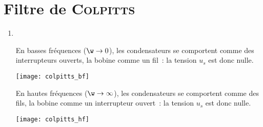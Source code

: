 \documentclass[a4paper, 12pt, final, garamond]{book}
\begin{document}
\section{Filtre de \textsc{Colpitts}}
\begin{enumerate}
    \item ~

        \vspace{-18pt}
        \begin{minipage}{0.48\linewidth}
            En basses fréquences ($\w \rightarrow 0$), les condensateurs se
            comportent comme des interrupteurs ouverts, la bobine comme un fil~: la
            tension $u_s$ est donc nulle.
            \begin{center}
                \texttt{[image: colpitts\_bf]}
            \end{center}
        \end{minipage}
        \hfill
        \vrule
        \hfill
        \begin{minipage}{0.48\linewidth}
            En hautes fréquences ($\w \rightarrow \infty$), les condensateurs se
            comportent comme des fils, la bobine comme un interrupteur ouvert~: la
            tension $u_s$ est donc nulle.
            \begin{center}
                \texttt{[image: colpitts\_hf]}
            \end{center}
        \end{minipage}


\end{enumerate}
\end{document}
